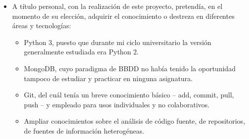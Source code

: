 \begin{itemize}
\item A título personal, con la realización de este proyecto, pretendía, en el momento de su elección, adquirir el conocimiento o destreza en diferentes áreas y tecnologías:

\begin{itemize}
\item Python 3, puesto que durante mi ciclo universitario la versión generalmente estudiada era Python 2.

\item MongoDB, cuyo paradigma de BBDD no había tenido la oportunidad tampoco de estudiar y practicar en ninguna asignatura.

\item Git, del cuál tenía un breve conocimiento básico – add, commit, pull, push – y empleado para usos individuales y no colaborativos.

\item Ampliar conocimientos sobre el análisis de código fuente, de repositorios, de fuentes de información heterogéneas.
\end{itemize}
\end{itemize}




